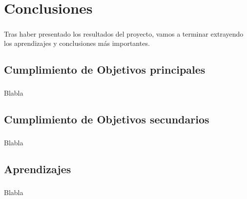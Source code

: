 \chapter{Conclusiones}\label{sec:conclusiones}

\paragraph{}Tras haber presentado los resultados del proyecto, vamos a terminar extrayendo
los aprendizajes y conclusiones más importantes.

\section{Cumplimiento de Objetivos principales}

\paragraph{}Blabla

\section{Cumplimiento de Objetivos secundarios}

\paragraph{}Blabla

\section{Aprendizajes}

\paragraph{}Blabla

